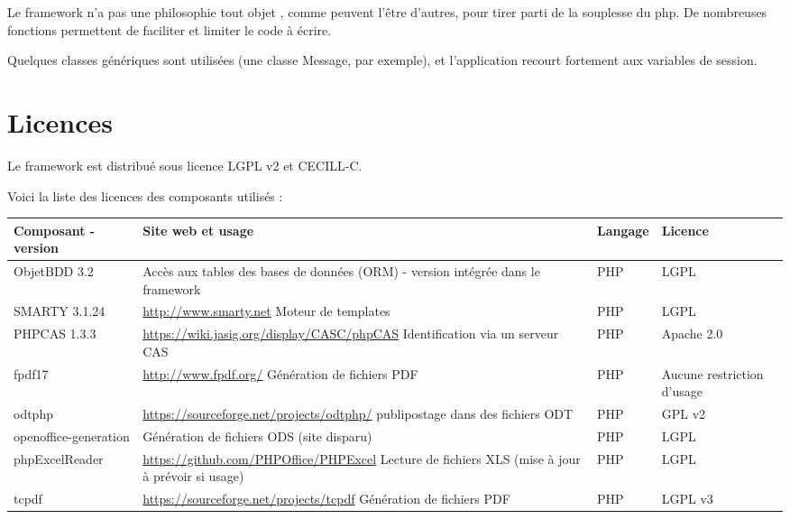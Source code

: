 Le framework n'a pas une philosophie \og tout objet \fg{}, comme peuvent l'être d'autres, pour tirer parti de la souplesse du php. De nombreuses fonctions permettent de faciliter et limiter le code à écrire.

Quelques classes génériques sont utilisées (une classe Message, par exemple), et l'application recourt fortement aux variables de session. 

\section{Licences}

Le framework est distribué sous licence LGPL v2 et CECILL-C.

Voici la liste des licences des composants utilisés :


\begin{longtable}{|>{\raggedright\arraybackslash}p{2cm}|p{7cm}|>{\raggedright\arraybackslash}p{1.5cm}|>{\raggedright\arraybackslash}p{1.5cm}|}
\hline
\textbf{Composant - version} & \textbf{Site web et usage} & \textbf{Langage} & \textbf{Licence} \\
\hline
\endhead
ObjetBDD 3.2 &  Accès aux tables des bases de données (ORM) - version intégrée dans le framework & PHP & LGPL \\
\hline
SMARTY 3.1.24 & \url{http://www.smarty.net} Moteur de templates & PHP & LGPL \\
\hline
PHPCAS 1.3.3 & \url{https://wiki.jasig.org/display/CASC/phpCAS} Identification via un serveur CAS & PHP & Apache 2.0\\
\hline
fpdf17 & \url{http://www.fpdf.org/} Génération de fichiers PDF & PHP & Aucune restriction d'usage\\
\hline
odtphp & \url{https://sourceforge.net/projects/odtphp/}  publipostage dans des fichiers ODT & PHP & GPL v2\\
\hline
openoffice-generation & Génération de fichiers ODS (site disparu) & PHP & LGPL \\
\hline
phpExcelReader & \url{https://github.com/PHPOffice/PHPExcel} Lecture de fichiers XLS (mise à jour à prévoir si usage) & PHP & LGPL\\
\hline
tcpdf & \url{https://sourceforge.net/projects/tcpdf} Génération de fichiers PDF & PHP & LGPL v3\\
\hline


\end{longtable}
